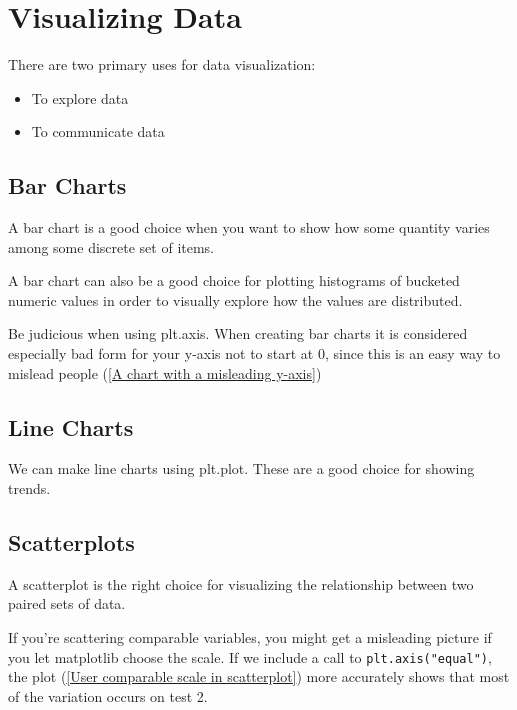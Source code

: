 \chapter{Visualizing Data}
There are two primary uses for data visualization:
\begin{itemize}
    \item To explore data
    \item To communicate data
\end{itemize}

\section{Bar Charts}
A bar chart is a good choice when you want to show how some quantity
varies among some discrete set of items.

A bar chart can also be a good choice for plotting histograms of bucketed
numeric values in order to visually explore how the values
are distributed.

Be judicious when using plt.axis. When creating bar charts it is
considered especially bad form for your y-axis not to start at 0, since this is
an easy way to mislead people (\autoref{A chart with a misleading y-axis})


\section{Line Charts}

We can make line charts using plt.plot. These are a
good choice for showing trends.
\section{Scatterplots}
A scatterplot is the right choice for visualizing the relationship between two
paired sets of data.

If you’re scattering comparable variables, you might get a misleading
picture if you let matplotlib choose the scale. If we include a call to \verb|plt.axis("equal")|, the plot (\autoref{User comparable scale in scatterplot}) more
accurately shows that most of the variation occurs on test 2.


